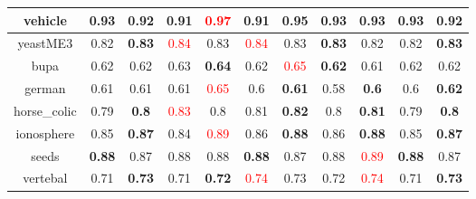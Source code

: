 \documentclass{article}%
\begin{document}
\begin{tabular}{c|cccccccccc}
\hline%
vehicle&\textbf{0.93}&0.92&0.91&\textcolor{red}{ 
0.97
}&0.91&\textbf{0.95}&0.93&0.93&\textbf{0.93}&0.92\\%
\hline%
yeastME3&0.82&\textbf{0.83}&\textcolor{red}{ 
0.84
}&0.83&\textcolor{red}{ 
0.84
}&0.83&\textbf{0.83}&0.82&0.82&\textbf{0.83}\\%
\hline%
bupa&0.62&0.62&0.63&\textbf{0.64}&0.62&\textcolor{red}{ 
0.65
}&\textbf{0.62}&0.61&0.62&0.62\\%
\hline%
german&0.61&0.61&0.61&\textcolor{red}{ 
0.65
}&0.6&\textbf{0.61}&0.58&\textbf{0.6}&0.6&\textbf{0.62}\\%
\hline%
horse\_colic&0.79&\textbf{0.8}&\textcolor{red}{ 
0.83
}&0.8&0.81&\textbf{0.82}&0.8&\textbf{0.81}&0.79&\textbf{0.8}\\%
\hline%
ionosphere&0.85&\textbf{0.87}&0.84&\textcolor{red}{ 
0.89
}&0.86&\textbf{0.88}&0.86&\textbf{0.88}&0.85&\textbf{0.87}\\%
\hline%
seeds&\textbf{0.88}&0.87&0.88&0.88&\textbf{0.88}&0.87&0.88&\textcolor{red}{ 
0.89
}&\textbf{0.88}&0.87\\%
\hline%
vertebal&0.71&\textbf{0.73}&0.71&\textbf{0.72}&\textcolor{red}{ 
0.74
}&0.73&0.72&\textcolor{red}{ 
0.74
}&0.71&\textbf{0.73}\\%
\hline%
\end{tabular}

%
\end{document}
